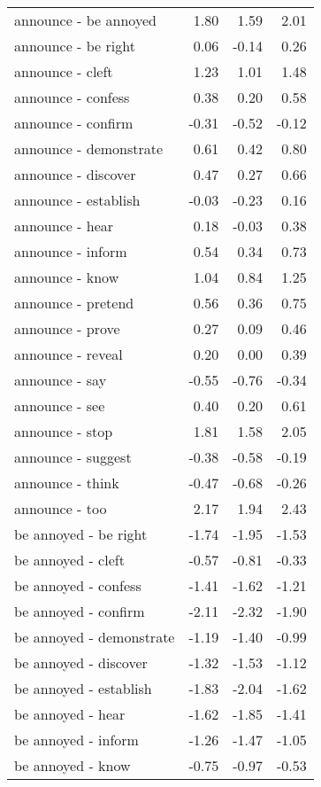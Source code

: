 \begin{longtable}{lrrr}
  announce - be annoyed & 1.80 & 1.59 & 2.01 \\ 
  announce - be right & 0.06 & -0.14 & 0.26 \\ 
  announce - cleft & 1.23 & 1.01 & 1.48 \\ 
  announce - confess & 0.38 & 0.20 & 0.58 \\ 
  announce - confirm & -0.31 & -0.52 & -0.12 \\ 
  announce - demonstrate & 0.61 & 0.42 & 0.80 \\ 
  announce - discover & 0.47 & 0.27 & 0.66 \\ 
  announce - establish & -0.03 & -0.23 & 0.16 \\ 
  announce - hear & 0.18 & -0.03 & 0.38 \\ 
  announce - inform & 0.54 & 0.34 & 0.73 \\ 
  announce - know & 1.04 & 0.84 & 1.25 \\ 
  announce - pretend & 0.56 & 0.36 & 0.75 \\ 
  announce - prove & 0.27 & 0.09 & 0.46 \\ 
  announce - reveal & 0.20 & 0.00 & 0.39 \\ 
  announce - say & -0.55 & -0.76 & -0.34 \\ 
  announce - see & 0.40 & 0.20 & 0.61 \\ 
  announce - stop & 1.81 & 1.58 & 2.05 \\ 
  announce - suggest & -0.38 & -0.58 & -0.19 \\ 
  announce - think & -0.47 & -0.68 & -0.26 \\ 
  announce - too & 2.17 & 1.94 & 2.43 \\ 
  be annoyed - be right & -1.74 & -1.95 & -1.53 \\ 
  be annoyed - cleft & -0.57 & -0.81 & -0.33 \\ 
  be annoyed - confess & -1.41 & -1.62 & -1.21 \\ 
  be annoyed - confirm & -2.11 & -2.32 & -1.90 \\ 
  be annoyed - demonstrate & -1.19 & -1.40 & -0.99 \\ 
  be annoyed - discover & -1.32 & -1.53 & -1.12 \\ 
  be annoyed - establish & -1.83 & -2.04 & -1.62 \\ 
  be annoyed - hear & -1.62 & -1.85 & -1.41 \\ 
  be annoyed - inform & -1.26 & -1.47 & -1.05 \\ 
  be annoyed - know & -0.75 & -0.97 & -0.53 \\ 

\end{longtable}
